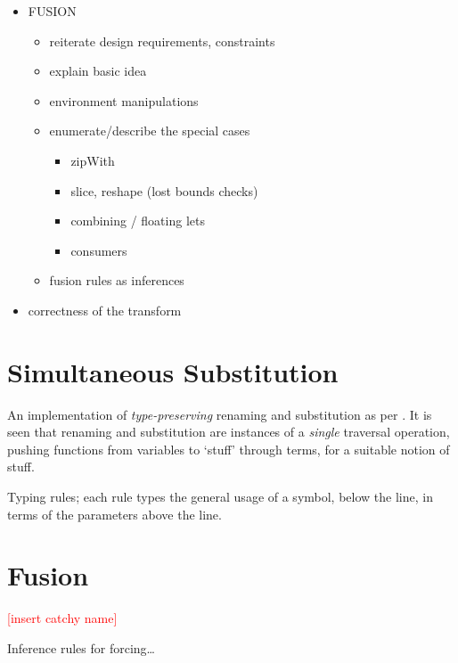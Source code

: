 \begin{itemize}
    \item FUSION
        \begin{itemize}
            \item reiterate design requirements, constraints
            \item explain basic idea
            \item environment manipulations
            \item enumerate/describe the special cases
                \begin{itemize}
                    \item zipWith
                    \item slice, reshape (lost bounds checks)
                    \item combining / floating lets
                    \item consumers
                \end{itemize}
            \item fusion rules as inferences
        \end{itemize}

    \item correctness of the transform

\end{itemize}


\section{Simultaneous Substitution}

An implementation of \emph{type-preserving} renaming and substitution as per
\citet{McBride:2006}. It is seen that renaming and substitution are instances of
a \emph{single} traversal operation, pushing functions from variables to `stuff'
through terms, for a suitable notion of stuff.

Typing rules; each rule types the general usage of a symbol, below the
line, in terms of the parameters above the line.


\section{Fusion}
\textcolor{red}{[insert catchy name]}

Inference rules for forcing\ldots

% 
% 
% 
% 
% 


